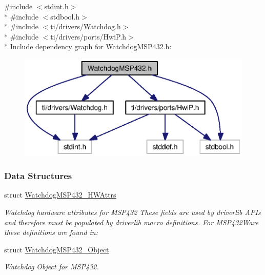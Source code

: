 {\ttfamily \#include $<$stdint.\+h$>$}\\*
{\ttfamily \#include $<$stdbool.\+h$>$}\\*
{\ttfamily \#include $<$ti/drivers/\+Watchdog.\+h$>$}\\*
{\ttfamily \#include $<$ti/drivers/ports/\+Hwi\+P.\+h$>$}\\*
Include dependency graph for Watchdog\+M\+S\+P432.\+h\+:
\nopagebreak
\begin{figure}[H]
\begin{center}
\leavevmode
\includegraphics[width=350pt]{_watchdog_m_s_p432_8h__incl}
\end{center}
\end{figure}
\subsubsection*{Data Structures}
\begin{DoxyCompactItemize}
\item 
struct \hyperlink{struct_watchdog_m_s_p432___h_w_attrs}{Watchdog\+M\+S\+P432\+\_\+\+H\+W\+Attrs}
\begin{DoxyCompactList}\small\item\em Watchdog hardware attributes for M\+S\+P432 These fields are used by driverlib A\+P\+Is and therefore must be populated by driverlib macro definitions. For M\+S\+P432\+Ware these definitions are found in\+: \end{DoxyCompactList}\item 
struct \hyperlink{struct_watchdog_m_s_p432___object}{Watchdog\+M\+S\+P432\+\_\+\+Object}
\begin{DoxyCompactList}\small\item\em Watchdog Object for M\+S\+P432. \end{DoxyCompactList}\end{DoxyCompactItemize}

